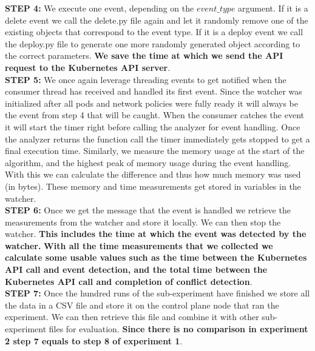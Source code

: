 \textbf{STEP 4:} We execute one event, depending on the $event\_type$ argument. If it is a delete event we call the delete.py file again and let it randomly remove one of the existing objects that correspond to the event type. If it is a deploy event we call the deploy.py file to generate one more randomly generated object according to the correct parameters. \textbf{We save the time at which we send the API request to the Kubernetes API server}.
\\[10pt]

\textbf{STEP 5:} We once again leverage threading events to get notified when the consumer thread has received and handled its first event. Since the watcher was initialized after all pods and network policies were fully ready it will always be the event from step 4 that will be caught. When the consumer catches the event it will start the timer right before calling the analyzer for event handling. Once the analyzer returns the function call the timer immediately gets stopped to get a final execution time. Similarly, we measure the memory usage at the start of the algorithm, and the highest peak of memory usage during the event handling. With this we can calculate the difference and thus how much memory was used (in bytes). These memory and time measurements get stored in variables in the watcher.
\\[10pt]

\textbf{STEP 6:} Once we get the message that the event is handled we retrieve the measurements from the watcher and store it locally. We can then stop the watcher. 
\textbf{This includes the time at which the event was detected by the watcher.} \textbf{With all the time measurements that we collected we calculate some usable values such as the time between the Kubernetes API call and event detection, and the total time between the Kubernetes API call and completion of conflict detection}.
\\[10pt]

\textbf{STEP 7:} Once the hundred runs of the sub-experiment have finished we store all the data in a CSV file and store it on the control plane node that ran the experiment. We can then retrieve this file and combine it with other sub-experiment files for evaluation.  \textbf{Since there is no comparison in experiment 2 step 7 equals to step 8 of experiment 1}. 
\\[10pt]


